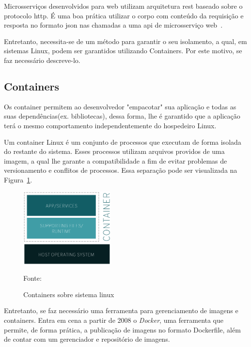 Microsserviços desenvolvidos para web utilizam arquitetura \ac{rest} baseado sobre o protocolo \ac{http}.
%
É uma boa prática utilizar o corpo com conteúdo da requisição e resposta no formato \ac{json} nas chamadas a uma \ac{api} de microsserviço web~\cite{Nadareishvili2016Aug}.

Entretanto, necessita-se de um método para garantir o seu isolamento, a qual, em sistemas Linux, podem ser garantidos utilizando Containers.
%
Por este motivo, se faz necessário descreve-lo.



\subsection{Containers}



Os container permitem ao desenvolvedor "empacotar" sua aplicação e todas as suas dependências(ex. bibliotecas), dessa forma, lhe é garantido que a aplicação terá o mesmo comportamento independentemente do hospedeiro Linux.

Um container Linux é um conjunto de processos que executam de forma isolada do restante do sistema. Esses processos utilizam arquivos providos de uma imagem, a qual lhe garante a compatibilidade a fim de evitar problemas de versionamento e conflitos de processos.
%
Essa separação pode ser visualizada na Figura~\ref{fig:container}.



\begin{figure}[htb!]
\caption{Containers sobre sistema linux}
\label{fig:container}
\includegraphics[height=4cm]{img/cap2/what-is-a-container.png}
\centering

Fonte:~\cite{container}
\end{figure}



Entretanto, se faz necessário uma ferramenta para gerenciamento de imagens e containers.
%
Entra em cena a partir de 2008 o \textit{Docker}, uma ferramenta que permite, de forma prática, a publicação de imagens no formato Dockerfile, além de contar com um gerenciador e repositório de imagens.


